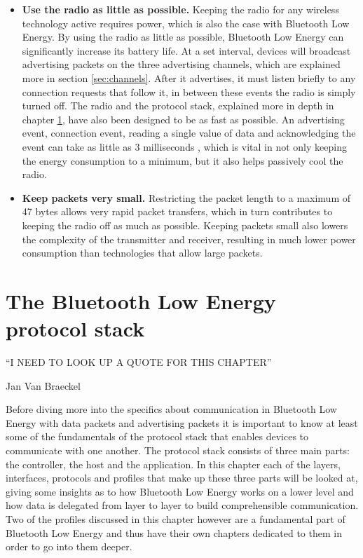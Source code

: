 \documentclass[pdftex,a4paper,12pt,twoside]{report}
\begin{document}
\begin{itemize}
\item{\textbf{Use the radio as little as possible.} Keeping the radio for any wireless technology active requires power, which is also the case with Bluetooth Low Energy. By using the radio as little as possible, Bluetooth Low Energy can significantly increase its battery life. At a set interval, devices will broadcast advertising packets on the three advertising channels, which are explained more in section \ref{sec:channels}. After it advertises, it must listen briefly to any connection requests that follow it, in between these events the radio is simply turned off. The radio and the protocol stack, explained more in depth in chapter \ref{ch:protocolstack}, have also been designed to be as fast as possible. An advertising event, connection event, reading a single value of data and acknowledging the event can take as little as 3 milliseconds \citep{heydon2012bluetooth}, which is vital in not only keeping the energy consumption to a minimum, but it also helps passively cool the radio.}

\item{\textbf{Keep packets very small.} Restricting the packet length to a maximum of 47 bytes allows very rapid packet transfers, which in turn contributes to keeping the radio off as much as possible. Keeping packets small also lowers the complexity of the transmitter and receiver, resulting in much lower power consumption than technologies that allow large packets.}
\end{itemize}

\chapter{The Bluetooth Low Energy protocol stack}
\label{ch:protocolstack}
\epigraph{``I NEED TO LOOK UP A QUOTE FOR THIS CHAPTER''}{Jan Van Braeckel}
Before diving more into the specifics about communication in Bluetooth Low Energy with data packets and advertising packets it is important to know at least some of the fundamentals of the protocol stack that enables devices to communicate with one another. The protocol stack consists of three main parts: the controller, the host and the application. In this chapter each of the layers, interfaces, protocols and profiles that make up these three parts will be looked at, giving some insights as to how Bluetooth Low Energy works on a lower level and how data is delegated from layer to layer to build comprehensible communication. Two of the profiles discussed in this chapter however are a fundamental part of Bluetooth Low Energy and thus have their own chapters dedicated to them in order to go into them deeper.
\end{document}
